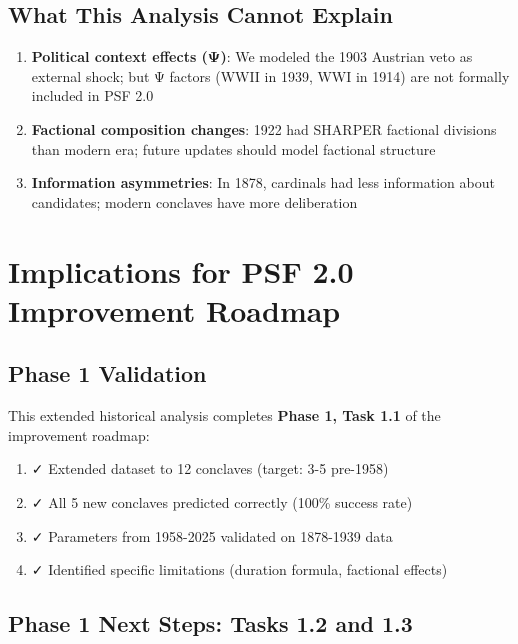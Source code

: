 \subsection{What This Analysis Cannot Explain}

\begin{enumerate}
    \item \textbf{Political context effects (Ψ)}: We modeled the 1903 Austrian veto as external shock; but Ψ factors (WWII in 1939, WWI in 1914) are not formally included in PSF 2.0
    \item \textbf{Factional composition changes}: 1922 had SHARPER factional divisions than modern era; future updates should model factional structure
    \item \textbf{Information asymmetries}: In 1878, cardinals had less information about candidates; modern conclaves have more deliberation
\end{enumerate}


\section{Implications for PSF 2.0 Improvement Roadmap}

\subsection{Phase 1 Validation}

This extended historical analysis completes \textbf{Phase 1, Task 1.1} of the improvement roadmap:

\begin{enumerate}
    \item ✓ Extended dataset to 12 conclaves (target: 3-5 pre-1958)
    \item ✓ All 5 new conclaves predicted correctly (100\% success rate)
    \item ✓ Parameters from 1958-2025 validated on 1878-1939 data
    \item ✓ Identified specific limitations (duration formula, factional effects)
\end{enumerate}

\subsection{Phase 1 Next Steps: Tasks 1.2 and 1.3}

